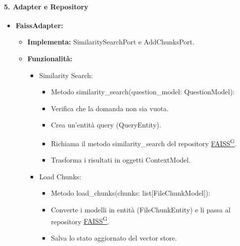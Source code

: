     \paragraph{5. Adapter e Repository}
    \begin{itemize}
        \item \textbf{FaissAdapter:}
        \begin{itemize}
            \item \textbf{Implementa:} SimilaritySearchPort e AddChunksPort.
            \item \textbf{Funzionalità:}
            \begin{itemize}
                \item Similarity Search:
                \begin{itemize}
                    \item Metodo similarity\_search(question\_model: QuestionModel):
                    \item Verifica che la domanda non sia vuota.
                    \item Crea un’entità query (QueryEntity).
                    \item Richiama il metodo similarity\_search del repository \href{https://code7crusaders.github.io/docs/\href{https://code7crusaders.github.io/docs/PB/documentazione_interna/glossario.html#pb-product-baseline}{PB\textsuperscript{G}}/documentazione_interna/glossario.html#faiss}{FAISS\textsuperscript{G}}.
                    \item Trasforma i risultati in oggetti ContextModel.
                \end{itemize}
                \item Load Chunks:
                \begin{itemize}
                    \item Metodo load\_chunks(chunks: list[FileChunkModel]):
                    \item Converte i modelli in entità (FileChunkEntity) e li passa al repository \href{https://code7crusaders.github.io/docs/\href{https://code7crusaders.github.io/docs/PB/documentazione_interna/glossario.html#pb-product-baseline}{PB\textsuperscript{G}}/documentazione_interna/glossario.html#faiss}{FAISS\textsuperscript{G}}.
                    \item Salva lo stato aggiornato del vector store.
                \end{itemize}
            \end{itemize}
        \end{itemize}
    \end{itemize}

